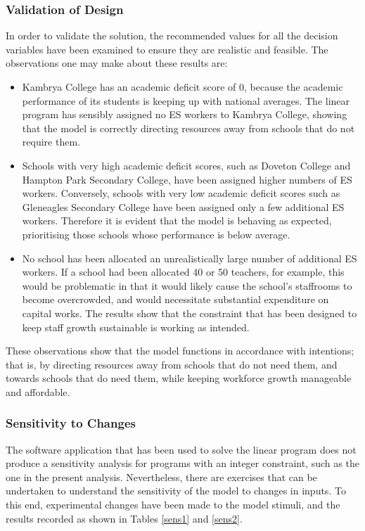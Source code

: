 \documentclass[11pt, a4paper]{article}
\begin{document}
    \subsubsection{Validation of Design}

    In order to validate the solution, the recommended values for all the decision variables have been examined to ensure they are realistic and feasible. The observations one may make about these results are:
    
    \begin{itemize}
        \item Kambrya College has an academic deficit score of 0, because the academic performance of its students is keeping up with national averages. The linear program has sensibly assigned no ES workers to Kambrya College, showing that the model is correctly directing resources away from schools that do not require them.
        \item Schools with very high academic deficit scores, such as Doveton College and Hampton Park Secondary College, have been assigned higher numbers of ES workers. Conversely, schools with very low academic deficit scores such as Gleneagles Secondary College have been assigned only a few additional ES workers. Therefore it is evident that the model is behaving as expected, prioritising those schools whose performance is below average.
        \item No school has been allocated an unrealistically large number of additional ES workers. If a school had been allocated 40 or 50 teachers, for example, this would be problematic in that it would likely cause the school's staffrooms to become overcrowded, and would necessitate substantial expenditure on capital works. The results show that the constraint that has been designed to keep staff growth sustainable is working as intended.
    \end{itemize}

    These observations show that the model functions in accordance with intentions; that is, by directing resources away from schools that do not need them, and towards schools that do need them, while keeping workforce growth manageable and affordable.

    \subsubsection{Sensitivity to Changes}    
    
    The software application that has been used to solve the linear program does not produce a sensitivity analysis for programs with an integer constraint, such as the one in the present analysis. Nevertheless, there are exercises that can be undertaken to understand the sensitivity of the model to changes in inputs. To this end, experimental changes have been made to the model stimuli, and the results recorded as shown in Tables \ref{sens1} and \ref{sens2}.
\end{document}

